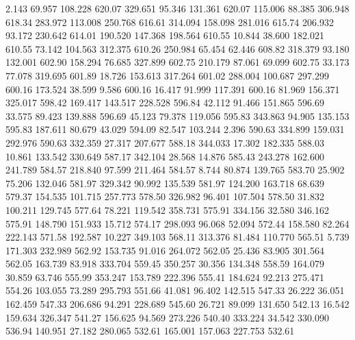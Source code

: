    2.143   69.957  108.228       620.07
 329.651   95.346  131.361       620.07
 115.006   88.385  306.948       618.34
 283.972  113.008  250.768       616.61
 314.094  158.098  281.016       615.74
 206.932   93.172  230.642       614.01
 190.520  147.368  198.564       610.55
  10.844   38.600  182.021       610.55
  73.142  104.563  312.375       610.26
 250.984   65.454   62.446       608.82
 318.379   93.180  132.001       602.90
 158.294   76.685  327.899       602.75
 210.179   87.061   69.099       602.75
  33.173   77.078  319.695       601.89
  18.726  153.613  317.264       601.02
 288.004  100.687  297.299       600.16
 173.524   38.599    9.586       600.16
  16.417   91.999  117.391       600.16
  81.969  156.371  325.017       598.42
 169.417  143.517  228.528       596.84
  42.112   91.466  151.865       596.69
  33.575   89.423  139.888       596.69
  45.123   79.378  119.056       595.83
 343.863   94.905  135.153       595.83
 187.611   80.679   43.029       594.09
  82.547  103.244    2.396       590.63
 334.899  159.031  292.976       590.63
 332.359   27.317  207.677       588.18
 344.033   17.302  182.335       588.03
  10.861  133.542  330.649       587.17
 342.104   28.568   14.876       585.43
 243.278  162.600  241.789       584.57
 218.840   97.599  211.464       584.57
   8.744   80.874  139.765       583.70
  25.902   75.206  132.046       581.97
 329.342   90.992  135.539       581.97
 124.200  163.718   68.639       579.37
 154.535  101.715  257.773       578.50
 326.982   96.401  107.504       578.50
  31.832  100.211  129.745       577.64
  78.221  119.542  358.731       575.91
 334.156   32.580  346.162       575.91
 148.790  151.933   15.712       574.17
 298.093   96.068   52.094       572.44
 158.580   82.264  222.143       571.58
 192.587   10.227  349.103       568.11
 313.376   81.484  110.770       565.51
   5.739  171.303  232.989       562.92
 153.735   91.016  264.072       562.05
  25.436   83.905  301.564       562.05
 163.739   83.918  333.704       559.45
 350.257   30.356  134.348       558.59
 164.079   30.859   63.746       555.99
 353.247  153.789  222.396       555.41
 184.624   92.213  275.471       554.26
 103.055   73.289  295.793       551.66
  41.081   96.402  142.515       547.33
  26.222   36.051  162.459       547.33
 206.686   94.291  228.689       545.60
  26.721   89.099  131.650       542.13
  16.542  159.634  326.347       541.27
 156.625   94.569  273.226       540.40
 333.224   34.542  330.090       536.94
 140.951   27.182  280.065       532.61
 165.001  157.063  227.753       532.61
